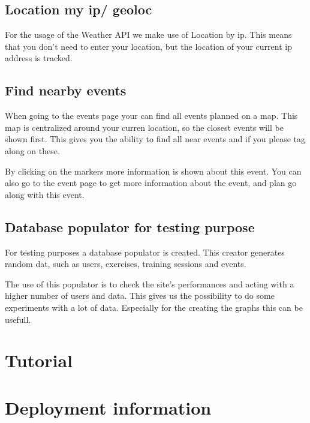 \documentclass[11pt,a4paper]{scrartcl}
\begin{document}
\subsection{Location my ip/ geoloc}
For the usage of the Weather API we make use of Location by ip. This means that you don't need to enter your location, but the location
of your current ip address is tracked.
\subsection{Find nearby events}
When going to the events page your can find all events planned on a map. This map is centralized around your curren location, so the 
closest events will be shown first. This gives you the ability to find all near events and if you please tag along on these.

By clicking on the markers more information is shown about this event. You can also go to the event page to get more information about
the event, and plan go along with this event.
\subsection{Database populator for testing purpose}
For testing purposes a database populator is created. This creator generates random dat, such as users, exercises, training sessions and
events. 

The use of this populator is to check the site's performances and acting with a higher number of users and data. This gives us the 
possibility to do some experiments with a lot of data. Especially for the creating the graphs this can be usefull.
\section{Tutorial}
\section{Deployment information}


\newpage        %

\newpage
\printindex                             %
\end{document}
